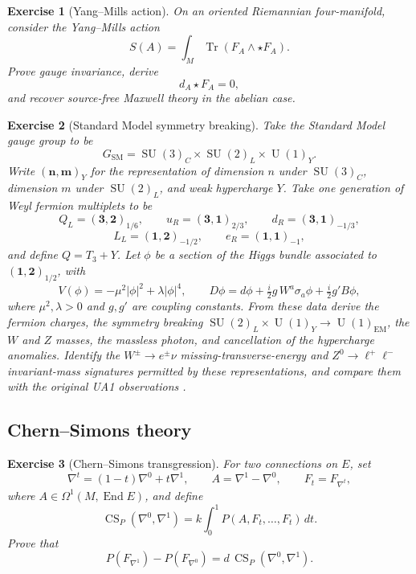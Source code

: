 \documentclass{article}
\newtheorem{exercise}{Exercise}
\newcommand{\End}{\operatorname{End}}
\begin{document}
\begin{exercise}[Yang--Mills action]\leavevmode\par
\textit{On an oriented Riemannian four-manifold, consider the Yang--Mills
action}
\[
S(A)=\int_M\operatorname{Tr}(F_A\wedge\star F_A).
\]
\textit{Prove gauge invariance, derive}
\[
d_A\star F_A=0,
\]
\textit{and recover source-free Maxwell theory in the abelian case.}
\end{exercise}

\begin{exercise}[Standard Model symmetry breaking]\leavevmode\par
\textit{Take the Standard Model gauge group to be}
\[
G_{\mathrm{SM}}
=\operatorname{SU}(3)_C\times\operatorname{SU}(2)_L
\times\operatorname{U}(1)_Y.
\]
\textit{Write $(\mathbf n,\mathbf m)_Y$ for the representation of dimension
$n$ under $\operatorname{SU}(3)_C$, dimension $m$ under
$\operatorname{SU}(2)_L$, and weak hypercharge $Y$. Take one generation of
Weyl fermion multiplets to be}
\[
Q_L=(\mathbf 3,\mathbf 2)_{1/6},
\qquad
u_R=(\mathbf 3,\mathbf 1)_{2/3},
\qquad
d_R=(\mathbf 3,\mathbf 1)_{-1/3},
\]
\[
L_L=(\mathbf 1,\mathbf 2)_{-1/2},
\qquad
e_R=(\mathbf 1,\mathbf 1)_{-1},
\]
\textit{and define $Q=T_3+Y$. Let $\phi$ be a section of the Higgs bundle
associated to $(\mathbf 1,\mathbf 2)_{1/2}$, with}
\[
V(\phi)=-\mu^2|\phi|^2+\lambda|\phi|^4,
\qquad
D\phi=d\phi+\tfrac{i}{2}g\,W^a\sigma_a\phi+\tfrac{i}{2}g'B\phi,
\]
\textit{where $\mu^2,\lambda>0$ and $g,g'$ are coupling constants. From
these data derive the fermion charges,
the symmetry breaking
$\operatorname{SU}(2)_L\times\operatorname{U}(1)_Y
\to\operatorname{U}(1)_{\mathrm{EM}}$, the $W$ and $Z$ masses, the massless
photon, and cancellation of the hypercharge anomalies. Identify the
$W^\pm\to e^\pm\nu$ missing-transverse-energy and
$Z^0\to\ell^+\ell^-$ invariant-mass signatures permitted by these
representations, and compare them with the original UA1 observations
\cite{ua1-w,ua1-z}.}
\end{exercise}

\subsection{Chern--Simons theory}

\begin{exercise}[Chern--Simons transgression]\leavevmode\par
\textit{For two connections on $E$, set}
\[
\nabla^t=(1-t)\nabla^0+t\nabla^1,
\qquad
A=\nabla^1-\nabla^0,
\qquad
F_t=F_{\nabla^t},
\]
\textit{where $A\in\Omega^1(M,\End E)$, and define}
\[
\operatorname{CS}_P(\nabla^0,\nabla^1)
=k\int_0^1P(A,F_t,\ldots,F_t)\,dt.
\]
\textit{Prove that}
\[
P(F_{\nabla^1})-P(F_{\nabla^0})
=d\,\operatorname{CS}_P(\nabla^0,\nabla^1).
\]
\end{exercise}
\end{document}
